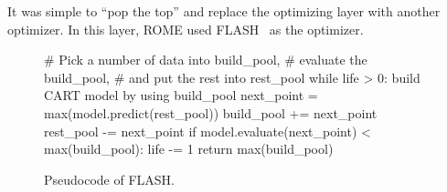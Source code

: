 \documentclass[sigconf,review,anonymous]{acmart}
\begin{document}
It was simple  to ``pop the top'' and replace the optimizing layer with another optimizer. In this layer, ROME used FLASH~\cite{nair2017flash} as the optimizer.

\begin{figure}
\begin{pythoncode}
    # Pick a number of data into build_pool, 
    # evaluate the build_pool, 
    # and put the rest into rest_pool
    while life > 0:
      build CART model by using build_pool
      next_point = max(model.predict(rest_pool))
      build_pool += next_point
      rest_pool -= next_point
      if model.evaluate(next_point) < max(build_pool):
          life -= 1
    return max(build_pool)
\end{pythoncode}
\caption{Pseudocode of FLASH.}\label{flash}  
\end{figure}
\end{document}
